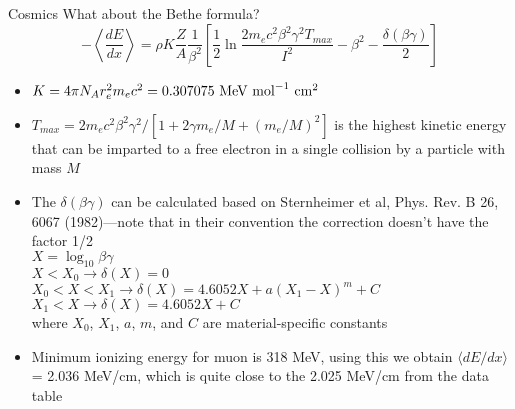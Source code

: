 \documentclass[compress,8pt]{beamer} %
\begin{document}
\begin{frame}{Cosmics}
What about the Bethe formula?
\begin{equation*}
-\left<\frac{dE}{dx}\right> = \rho K\frac{Z}{A}\frac{1}{\beta^2}
\left[ \frac{1}{2} \ln \frac{2m_ec^2\beta^2\gamma^2T_{max}}{I^2} - \beta^2 - \frac{\delta(\beta\gamma)}{2}\right]
\end{equation*}
\begin{itemize}
\item $K = 4\pi N_A r_e^2 m_ec^2 = 0.307075~\textnormal{MeV}~\textnormal{mol}^{-1}~\textnormal{cm}^2$
\item $T_{max} = 2m_ec^2\beta^2\gamma^2/[1 + 2\gamma m_e/M + (m_e/M)^2]$
is the highest kinetic energy that can be imparted to a free electron in a single collision
by a particle with mass $M$
\item The $\delta(\beta\gamma)$ can be calculated based on Sternheimer et al, Phys. Rev. B 26, 6067
(1982)---note that in their convention the correction doesn't have the factor 1/2 \\
$X = \log_{10} \beta\gamma$ \\
$X < X_0 \rightarrow \delta(X) = 0$ \\
$X_0 < X < X_1 \rightarrow \delta(X) = 4.6052X + a(X_1-X)^m + C$ \\
$X_1 < X \rightarrow \delta(X) = 4.6052X + C$ \\
where $X_0$, $X_1$, $a$, $m$, and $C$ are material-specific constants
\item Minimum ionizing energy for muon is 318 MeV, using this we obtain $\langle dE/dx\rangle$ = 2.036 MeV/cm,
which is quite close to the 2.025 MeV/cm from the data table
\end{itemize}
\end{frame}
\end{document}
